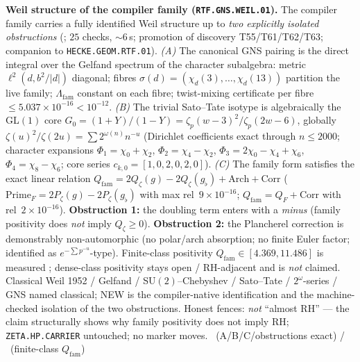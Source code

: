 \documentclass[11pt,a4paper]{article}
\theoremstyle{definition}
\begin{document}
\par\smallskip\noindent\textbf{Weil structure of the compiler family
(\texttt{RTF.GNS.WEIL.01}).}
The compiler family carries a fully identified Weil structure up to
\emph{two explicitly isolated obstructions}
(; $25$ checks, $\sim6$\,s; promotion of discovery
T55/T61/T62/T63; companion to \texttt{HECKE.GEOM.RTF.01}).
\emph{(A)} The canonical GNS pairing is the direct integral over the Gelfand spectrum of
the character subalgebra: metric $\ell^2(d,b^2/|d|)$ diagonal; fibres
$\sigma(d)=(\chi_d(3),\ldots,\chi_d(13))$ partition the live family; $\Lambda_{\mathrm{fam}}$
constant on each fibre; twist-mixing certificate per fibre
$\le5.037\times10^{-16}<10^{-12}$.
\emph{(B)} The trivial Sato--Tate isotype is algebraically the GL$(1)$ core
$G_0=(1+Y)/(1-Y)=\zeta_p(w-3)^2/\zeta_p(2w-6)$, globally
$\zeta(u)^2/\zeta(2u)=\sum 2^{\omega(n)}n^{-u}$ (Dirichlet coefficients exact through
$n\le2000$; character expansions
$\Phi_1=\chi_0+\chi_2$, $\Phi_2=\chi_4-\chi_2$, $\Phi_3=2\chi_0-\chi_4+\chi_6$,
$\Phi_4=\chi_8-\chi_6$; core series $c_{k,0}=[1,0,2,0,2,0]$).
\emph{(C)} The family form satisfies the exact linear relation
$Q_{\mathrm{fam}}=2Q_\zeta(g)-2Q_\zeta(g_\flat)+\mathrm{Arch}+\mathrm{Corr}$
($\mathrm{Prime}_F=2P_\zeta(g)-2P_\zeta(g_\flat)$ with max rel~$9\times10^{-16}$;
$Q_{\mathrm{fam}}=Q_F+\mathrm{Corr}$ with rel~$2\times10^{-16}$).
\textbf{Obstruction 1:} the doubling term enters with a \emph{minus}
(family positivity does \emph{not} imply $Q_\zeta\ge0$).
\textbf{Obstruction 2:} the Plancherel correction is demonstrably non-automorphic
(no polar/arch absorption; no finite Euler factor; identified as
$e^{-\sum p^{-u}}$-type).
Finite-class positivity $Q_{\mathrm{fam}}\in[4.369,11.486]$ is measured \mC;
dense-class positivity stays open / RH-adjacent and is \emph{not} claimed.
Classical Weil 1952 / Gelfand / SU$(2)$--Chebyshev / Sato--Tate / $2^\omega$-series / GNS
named classical; NEW is the compiler-native identification and the machine-checked
isolation of the two obstructions.
Honest fences: \emph{not} ``almost RH'' --- the claim structurally shows why family
positivity does not imply RH; \texttt{ZETA.HP.CARRIER} untouched; no marker moves.
\mE\ (A/B/C/obstructions exact) / \mC\ (finite-class $Q_{\mathrm{fam}}$)
\end{document}
